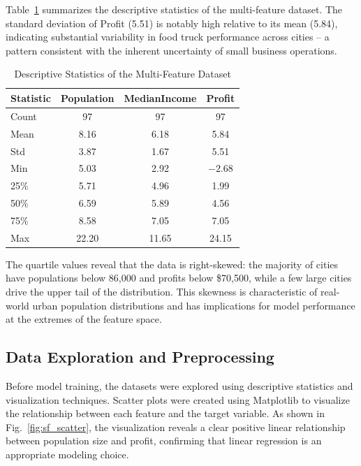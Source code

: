 \documentclass[conference]{IEEEtran}
\begin{document}
Table~\ref{tab:stats} summarizes the descriptive statistics of the multi-feature dataset. The standard deviation of Profit (5.51) is notably high relative to its mean (5.84), indicating substantial variability in food truck performance across cities -- a pattern consistent with the inherent uncertainty of small business operations.

\begin{table}[htbp]
\caption{Descriptive Statistics of the Multi-Feature Dataset}
\begin{center}
\begin{tabular}{|l|c|c|c|}
\hline
\textbf{Statistic} & \textbf{Population} & \textbf{MedianIncome} & \textbf{Profit} \\
\hline
Count & 97 & 97 & 97 \\
Mean & 8.16 & 6.18 & 5.84 \\
Std & 3.87 & 1.67 & 5.51 \\
Min & 5.03 & 2.92 & $-2.68$ \\
25\% & 5.71 & 4.96 & 1.99 \\
50\% & 6.59 & 5.89 & 4.56 \\
75\% & 8.58 & 7.05 & 7.05 \\
Max & 22.20 & 11.65 & 24.15 \\
\hline
\end{tabular}
\label{tab:stats}
\end{center}
\end{table}

The quartile values reveal that the data is right-skewed: the majority of cities have populations below 86,000 and profits below \$70,500, while a few large cities drive the upper tail of the distribution. This skewness is characteristic of real-world urban population distributions and has implications for model performance at the extremes of the feature space.

\subsection{Data Exploration and Preprocessing}

Before model training, the datasets were explored using descriptive statistics and visualization techniques. Scatter plots were created using Matplotlib \cite{b4} to visualize the relationship between each feature and the target variable. As shown in Fig.~\ref{fig:sf_scatter}, the visualization reveals a clear positive linear relationship between population size and profit, confirming that linear regression is an appropriate modeling choice.
\end{document}
